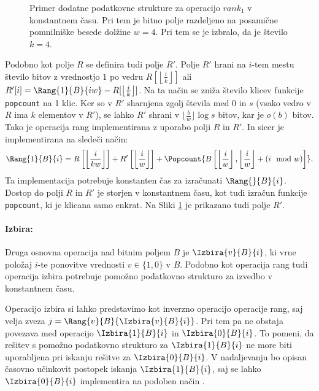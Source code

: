 \begin{figure}[htb]
    \begin{center}
        
        \caption{Primer dodatne podatkovne strukture za operacijo $rank_1$ v konstantnem času. Pri tem je bitno polje razdeljeno na posamične pomnilniške besede dolžine $w=4$. Pri tem se je izbralo, da je število $k=4$.} 
        \label{fig:rank}
    \end{center}
\end{figure}

Podobno kot polje $R$ se definira tudi polje $R'$. Polje $R'$ hrani na $i$-tem mestu število bitov z vrednostjo $1$ po vedru $R[\left\lfloor\frac{i}{k} \right\rfloor]$ ali $R'[i]=\Rang{1}{B}{iw}-R[\left\lfloor\frac{i}{k} \right\rfloor]$. Na ta način se zniža število klicev funkcije \texttt{popcount} na 1 klic. Ker so v $R'$ sharnjena zgolj števila med 0 in $s$ (vsako vedro v $R$ ima $k$ elementov v $R'$), se lahko $R'$ shrani v $\lfloor\frac{b}{w}\rfloor\log{s}$ bitov, kar je $o(b)$ bitov. Tako je operacija rang implementirana z uporabo polji $R$ in $R'$. In sicer je implementirana na sledeči način:
\begin{equation*}
    \Rang{1}{B}{i}=R\left[\left\lfloor\frac{i}{kw} \right\rfloor\right]+ R'\left[\left\lfloor\frac{i}{w} \right\rfloor\right]+\Popcount{B\left[\left\lfloor\frac{i}{w} \right\rfloor,\left\lfloor\frac{i}{w} \right\rfloor+(i \mod w)\right]}.
\end{equation*}
Ta implementacija potrebuje konstanten čas za izračunati $\Rang{}{B}{i}$. Dostop do polji $R$ in $R'$ je storjen v konstantnem času, kot tudi izračun funkcije \texttt{popcount}, ki je klicana samo enkrat\cite{Navarro2016}. Na Sliki \ref{fig:rank} je prikazano tudi polje $R'$.

\paragraph{Izbira:}
Druga osnovna operacija nad bitnim poljem $B$ je $\Izbira{v}{B}{i}$, ki vrne položaj $i$-te ponovitve vrednosti $v\in\{1,0\}$ v $B$. Podobno kot operacija rang tudi operacija izbira potrebuje pomožno podatkovno strukturo za izvedbo v konstantnem času. 

Operacijo izbira si lahko predstavimo kot inverzno operacijo operacije rang, saj velja zveza $j=\Rang{v}{B}{\Izbira{v}{B}{i}}$. Pri tem pa ne obstaja povezava med operacijo $\Izbira{1}{B}{i}$ in $\Izbira{0}{B}{i}$. To pomeni, da rešitev s pomožno podatkovno strukturo za $\Izbira{1}{B}{i}$ ne more biti uporabljena pri iskanju rešitve za $\Izbira{0}{B}{i}$. V nadaljevanju bo opisan časovno učinkovit postopek iskanja $\Izbira{1}{B}{i}$, saj se lahko $\Izbira{0}{B}{i}$ implementira na podoben način \cite{Navarro2016}.

